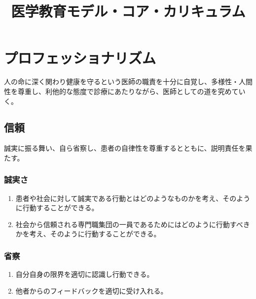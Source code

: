 \documentclass[
]{ltjsarticle}
\title{医学教育モデル・コア・カリキュラム}
\author{}
\date{}
\providecommand{\tightlist}{%
  \setlength{\itemsep}{0pt}\setlength{\parskip}{0pt}}
\begin{document}
\maketitle

{
\setcounter{tocdepth}{3}
\tableofcontents
}
\newpage

\hypertarget{ux30d7ux30edux30d5ux30a7ux30c3ux30b7ux30e7ux30caux30eaux30baux30e0}{%
\section{プロフェッショナリズム}\label{ux30d7ux30edux30d5ux30a7ux30c3ux30b7ux30e7ux30caux30eaux30baux30e0}}

人の命に深く関わり健康を守るという医師の職責を十分に自覚し、多様性・人間性を尊重し、利他的な態度で診療にあたりながら、医師としての道を究めていく。

\hypertarget{ux4fe1ux983c}{%
\subsection{信頼}\label{ux4fe1ux983c}}

誠実に振る舞い、自ら省察し、患者の自律性を尊重するとともに、説明責任を果たす。

\hypertarget{ux8aa0ux5b9fux3055}{%
\subsubsection{誠実さ}\label{ux8aa0ux5b9fux3055}}

\begin{enumerate}
\def\labelenumi{\arabic{enumi}.}
\tightlist
\item
  患者や社会に対して誠実である行動とはどのようなものかを考え、そのように行動することができる。
\item
  社会から信頼される専門職集団の一員であるためにはどのように行動すべきかを考え、そのように行動することができる。
\end{enumerate}

\hypertarget{ux7701ux5bdf}{%
\subsubsection{省察}\label{ux7701ux5bdf}}

\begin{enumerate}
\def\labelenumi{\arabic{enumi}.}
\tightlist
\item
  自分自身の限界を適切に認識し行動できる。
\item
  他者からのフィードバックを適切に受け入れる。
\end{enumerate}
\end{document}

